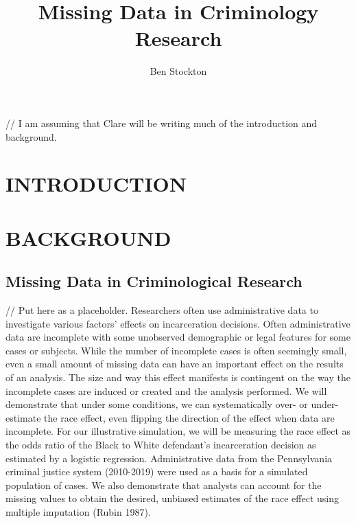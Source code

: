 \documentclass[
  letterpaper,
  DIV=11,
  numbers=noendperiod]{scrartcl}
\title{Missing Data in Criminology Research}
\author{Ben Stockton}
\date{}
\renewcommand*\contentsname{Table of contents}
\newcommand\contentsname{Table of contents}
\begin{document}
\maketitle
\ifdefined\Shaded\renewenvironment{Shaded}{\begin{tcolorbox}[interior hidden, boxrule=0pt, borderline west={3pt}{0pt}{shadecolor}, sharp corners, frame hidden, breakable, enhanced]}{\end{tcolorbox}}\fi

\renewcommand*\contentsname{Table of contents}
{
\hypersetup{linkcolor=}
\setcounter{tocdepth}{3}
\tableofcontents
}
// I am assuming that Clare will be writing much of the introduction and
background.

\hypertarget{sec-intro}{%
\section{INTRODUCTION}\label{sec-intro}}

\hypertarget{sec-background}{%
\section{BACKGROUND}\label{sec-background}}

\hypertarget{sec-missing-data-crim-research}{%
\subsection{Missing Data in Criminological
Research}\label{sec-missing-data-crim-research}}

// Put here as a placeholder. Researchers often use administrative data
to investigate various factors' effects on incarceration decisions.
Often administrative data are incomplete with some unobserved
demographic or legal features for some cases or subjects. While the
number of incomplete cases is often seemingly small, even a small amount
of missing data can have an important effect on the results of an
analysis. The size and way this effect manifests is contingent on the
way the incomplete cases are induced or created and the analysis
performed. We will demonstrate that under some conditions, we can
systematically over- or under-estimate the race effect, even flipping
the direction of the effect when data are incomplete. For our
illustrative simulation, we will be measuring the race effect as the
odds ratio of the Black to White defendant's incarceration decision as
estimated by a logistic regression. Administrative data from the
Pennsylvania criminal justice system (2010-2019) were used as a basis
for a simulated population of cases. We also demonstrate that analysts
can account for the missing values to obtain the desired, unbiased
estimates of the race effect using multiple imputation (Rubin 1987).
\end{document}
